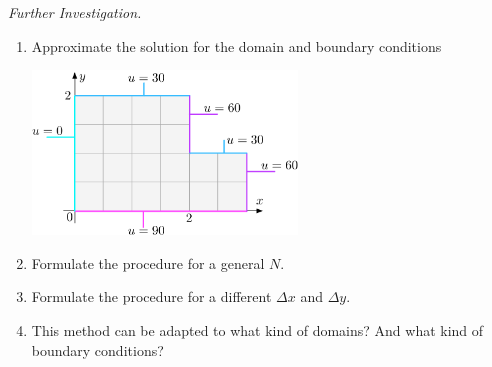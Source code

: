 \vfill

\emph{Further Investigation. } 
\begin{enumerate}[label=\emph{\arabic*.}]
\item Approximate the solution for the domain and boundary conditions
\begin{center}
\includegraphics*[width=200pt]{images/project-numericalPDE-domain2.pdf}
\end{center}

\item Formulate the procedure for a general $N$.

\item Formulate the procedure for a different $\Delta x$ and $\Delta y$.

\item This method can be adapted to what kind of domains? And what kind of boundary conditions?

\end{enumerate}

\begin{noexercises}
\end{noexercises}
